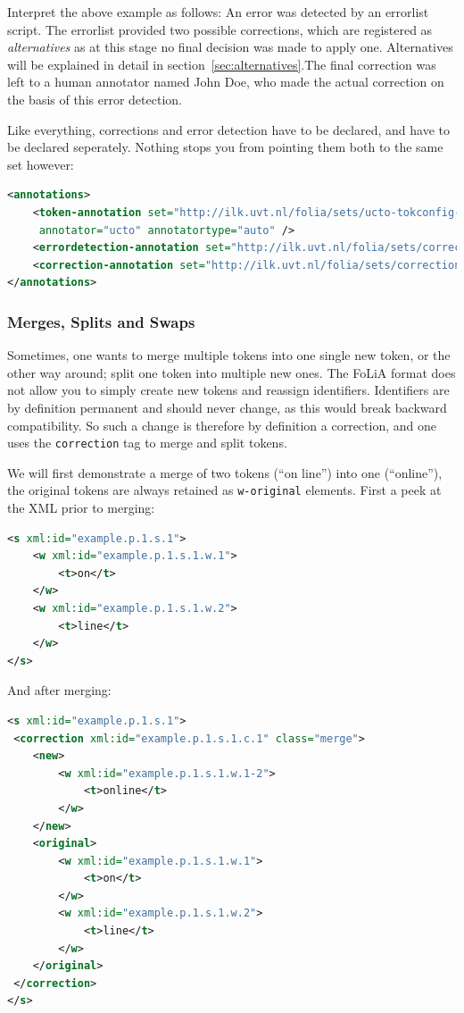\documentclass[a4paper,12pt]{report}
\begin{document}
Interpret the above example as follows: An error was detected by an errorlist script. The errorlist provided two possible corrections, which are registered as \emph{alternatives} as at this stage no final decision was made to apply one. Alternatives will be explained in detail in section~\ref{sec:alternatives}.The final correction was left to a human annotator named John Doe, who made the actual correction on the basis of this error detection.

Like everything, corrections and error detection have to be declared, and have to be declared seperately. Nothing stops you from pointing them both to the same set however:

\begin{lstlisting}[language=xml]
<annotations>
    <token-annotation set="http://ilk.uvt.nl/folia/sets/ucto-tokconfig-nl" 
     annotator="ucto" annotatortype="auto" />
    <errordetection-annotation set="http://ilk.uvt.nl/folia/sets/corrections" />
    <correction-annotation set="http://ilk.uvt.nl/folia/sets/corrections" />
</annotations>
\end{lstlisting}

\subsubsection{Merges, Splits and Swaps} 

Sometimes, one wants to merge multiple tokens into one single new token, or the other way around; split one token into multiple new ones. The FoLiA format does not allow you to simply create new tokens and reassign identifiers. Identifiers are by definition permanent and should never change, as this would break backward compatibility. So such a change is therefore by definition a correction, and one uses the \texttt{correction} tag to merge and split tokens.

We will first demonstrate a merge of two tokens (``on line'') into one (``online''), the original tokens are always retained as \texttt{w-original} elements. First a peek at the XML prior to merging:

\begin{lstlisting}[language=xml]
<s xml:id="example.p.1.s.1">
    <w xml:id="example.p.1.s.1.w.1">
        <t>on</t>
    </w>
    <w xml:id="example.p.1.s.1.w.2">
        <t>line</t>
    </w>                       
</s>  
\end{lstlisting}

And after merging:

\begin{lstlisting}[language=xml]
<s xml:id="example.p.1.s.1">
 <correction xml:id="example.p.1.s.1.c.1" class="merge">
    <new>
        <w xml:id="example.p.1.s.1.w.1-2">        
            <t>online</t>
        </w>
    </new>
    <original>
        <w xml:id="example.p.1.s.1.w.1">
            <t>on</t>
        </w>
        <w xml:id="example.p.1.s.1.w.2">
            <t>line</t>
        </w>                         
    </original>
 </correction>               
</s>
\end{lstlisting} 
\end{document}
